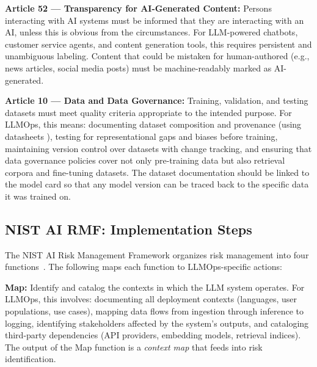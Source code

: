 \textbf{Article 52 --- Transparency for AI-Generated Content:} Persons interacting with AI systems must be informed that they are interacting with an AI, unless this is obvious from the circumstances. For LLM-powered chatbots, customer service agents, and content generation tools, this requires persistent and unambiguous labeling. Content that could be mistaken for human-authored (e.g., news articles, social media posts) must be machine-readably marked as AI-generated.

\textbf{Article 10 --- Data and Data Governance:} Training, validation, and testing datasets must meet quality criteria appropriate to the intended purpose. For LLMOps, this means: documenting dataset composition and provenance (using datasheets \cite{gebru_datasheets}), testing for representational gaps and biases before training, maintaining version control over datasets with change tracking, and ensuring that data governance policies cover not only pre-training data but also retrieval corpora and fine-tuning datasets. The dataset documentation should be linked to the model card so that any model version can be traced back to the specific data it was trained on.


\subsection{NIST AI RMF: Implementation Steps}\label{sec:ch11_nist_rmf}

The NIST AI Risk Management Framework organizes risk management into four functions~\cite{nist_ai_rmf_100_1}. The following maps each function to LLMOps-specific actions:

\textbf{Map:} Identify and catalog the contexts in which the LLM system operates. For LLMOps, this involves: documenting all deployment contexts (languages, user populations, use cases), mapping data flows from ingestion through inference to logging, identifying stakeholders affected by the system's outputs, and cataloging third-party dependencies (API providers, embedding models, retrieval indices). The output of the Map function is a \emph{context map} that feeds into risk identification.

